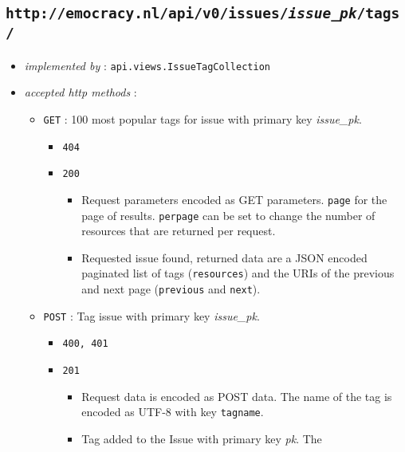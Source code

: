 \documentclass[a4paper]{report}
\begin{document}
\subsection{\texttt{http://emocracy.nl/api/v0/issues/\emph{issue\_pk}/tags/}}
\begin{itemize}
    \item{\textsl{implemented by} : \texttt{api.views.IssueTagCollection}}
    \item{\textsl{accepted http methods} :
        \begin{itemize}
            \item{\texttt{GET} : 100 most popular tags for issue with primary key \emph{issue\_pk}.
                \begin{itemize}
                    \item{\texttt{404}}
                    \item{\texttt{200}
                        \begin{itemize}
                        \item{Request parameters encoded as GET parameters. 
                            \texttt{page} for the page of results.
                            \texttt{perpage} can be set to change the number of 
                            resources that are returned per request.                        
                        }
                        \item{
                            Requested issue found, returned data are a JSON encoded
                            paginated list of tags (\texttt{resources}) and the URIs of 
                            the previous and next page (\texttt{previous} and \texttt{next}).
                        }
                        \end{itemize}
                    }
                \end{itemize}
            }
            \item{\texttt{POST} : Tag issue with primary key \emph{issue\_pk}.
                \begin{itemize}
                    \item{\texttt{400, 401}}
                    \item{\texttt{201}
                    \begin{itemize}
                    \item{Request data is encoded as POST data. The name of the 
                    tag is encoded as UTF-8 with key \texttt{tagname}.}
                    \item{Tag added to the Issue with primary key \emph{pk}. The 
}
\end{itemize}}
\end{itemize}}
\end{itemize}}
\end{itemize}
\end{document}
